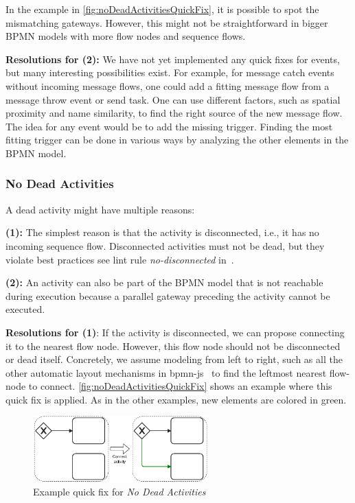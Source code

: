 \documentclass[runningheads]{llncs}
\begin{document}
In the example in \autoref{fig:noDeadActivitiesQuickFix}, it is possible to spot the mismatching gateways.
However, this might not be straightforward in bigger BPMN models with more flow nodes and sequence flows.

\textbf{Resolutions for (2):} We have not yet implemented any quick fixes for events, but many interesting possibilities exist.
For example, for message catch events without incoming message flows, one could add a fitting message flow from a message throw event or send task.
One can use different factors, such as spatial proximity and name similarity, to find the right source of the new message flow.
The idea for any event would be to add the missing trigger.
Finding the most fitting trigger can be done in various ways by analyzing the other elements in the BPMN model.


\subsubsection{No Dead Activities}
A dead activity might have multiple reasons:

\textbf{(1):} The simplest reason is that the activity is disconnected, i.e., it has no incoming sequence flow.
Disconnected activities must not be dead, but they violate best practices see lint rule \textit{no-disconnected} in~\cite{camundaservicesgmbhBpmnlint2024}.

\textbf{(2):} An activity can also be part of the BPMN model that is not reachable during execution because a parallel gateway preceding the activity cannot be executed.

\textbf{Resolutions for (1)}: If the activity is disconnected, we can propose connecting it to the nearest flow node.
However, this flow node should not be disconnected or dead itself.
Concretely, we assume modeling from left to right, such as all the other automatic layout mechanisms in bpmn-js~\cite{camundaservicesgmbhBpmnjs2024} to find the leftmost nearest flow-node to connect.
\autoref{fig:noDeadActivitiesQuickFix} shows an example where this quick fix is applied.
As in the other examples, new elements are colored in green.

\begin{figure}[ht]
	\centering
	\includegraphics[width=0.6\textwidth]{images/dead}
	\caption{Example quick fix for \textit{No Dead Activities}}
	\label{fig:noDeadActivitiesQuickFix}
\end{figure}
\end{document}
